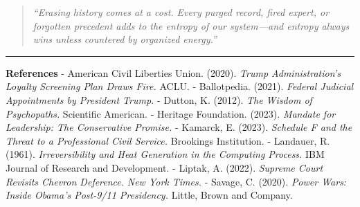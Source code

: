 \documentclass[
]{article}
\begin{document}
\begin{quote}
\emph{``Erasing history comes at a cost. Every purged record, fired expert, or forgotten precedent adds to the entropy of our system---and entropy always wins unless countered by organized energy.''}
\end{quote}

\begin{center}\rule{0.5\linewidth}{0.5pt}\end{center}

\textbf{References}
- American Civil Liberties Union. (2020). \emph{Trump Administration's Loyalty Screening Plan Draws Fire.} ACLU.
- Ballotpedia. (2021). \emph{Federal Judicial Appointments by President Trump.}
- Dutton, K. (2012). \emph{The Wisdom of Psychopaths.} Scientific American.
- Heritage Foundation. (2023). \emph{Mandate for Leadership: The Conservative Promise.}
- Kamarck, E. (2023). \emph{Schedule F and the Threat to a Professional Civil Service.} Brookings Institution.
- Landauer, R. (1961). \emph{Irreversibility and Heat Generation in the Computing Process.} IBM Journal of Research and Development.
- Liptak, A. (2022). \emph{Supreme Court Revisits Chevron Deference.} \emph{New York Times.}
- Savage, C. (2020). \emph{Power Wars: Inside Obama's Post-9/11 Presidency.} Little, Brown and Company.
\end{document}
